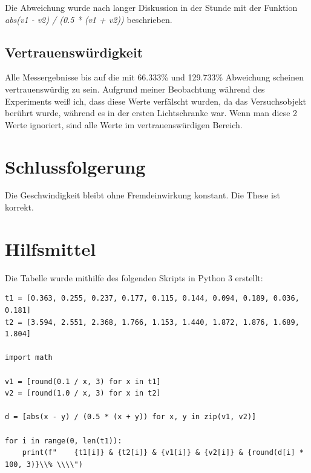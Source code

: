 \documentclass[8pt, letterpaper]{article}
\begin{document}
Die Abweichung wurde nach langer Diskussion in der Stunde mit der Funktion \textit{abs(v1 - v2) / (0.5 * (v1 + v2))} beschrieben.

\subsection{Vertrauenswürdigkeit}
Alle Messergebnisse bis auf die mit 66.333\% und 129.733\% Abweichung scheinen vertrauenswürdig zu sein. Aufgrund meiner Beobachtung während des Experiments weiß ich, dass diese Werte verfälscht wurden, da das Versuchsobjekt berührt wurde, während es in der ersten Lichtschranke war. Wenn man diese 2 Werte ignoriert, sind alle Werte im vertrauenswürdigen Bereich.

\section{Schlussfolgerung}
Die Geschwindigkeit bleibt ohne Fremdeinwirkung konstant. Die These ist korrekt.

\section{Hilfsmittel}
Die Tabelle wurde mithilfe des folgenden Skripts in Python 3 erstellt:

\tiny
\begin{lstlisting}
t1 = [0.363, 0.255, 0.237, 0.177, 0.115, 0.144, 0.094, 0.189, 0.036, 0.181]
t2 = [3.594, 2.551, 2.368, 1.766, 1.153, 1.440, 1.872, 1.876, 1.689, 1.804]

import math

v1 = [round(0.1 / x, 3) for x in t1]
v2 = [round(1.0 / x, 3) for x in t2]

d = [abs(x - y) / (0.5 * (x + y)) for x, y in zip(v1, v2)]

for i in range(0, len(t1)):
    print(f"    {t1[i]} & {t2[i]} & {v1[i]} & {v2[i]} & {round(d[i] * 100, 3)}\\% \\\\")
\end{lstlisting}

% 
\end{document}
